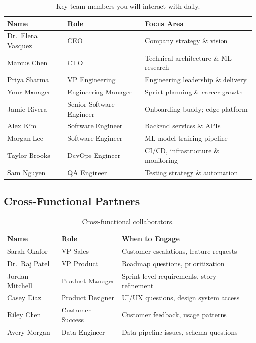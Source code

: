 \documentclass[
    language=english,
    doctype=onboarding-guide,
    institution=none,
]{../../omnilatex}
\begin{document}
\begin{table}[h]
    \centering
    \begin{tabular}{lll}
        \toprule
        \textbf{Name} & \textbf{Role} & \textbf{Focus Area} \\
        \midrule
        Dr.\ Elena Vasquez    & CEO            & Company strategy \& vision \\
        Marcus Chen           & CTO            & Technical architecture \& ML research \\
        Priya Sharma          & VP Engineering & Engineering leadership \& delivery \\
        Your Manager          & Engineering Manager & Sprint planning \& career growth \\
        Jamie Rivera          & Senior Software Engineer & Onboarding buddy; edge platform \\
        Alex Kim              & Software Engineer & Backend services \& APIs \\
        Morgan Lee            & Software Engineer & ML model training pipeline \\
        Taylor Brooks         & DevOps Engineer & CI/CD, infrastructure \& monitoring \\
        Sam Nguyen            & QA Engineer    & Testing strategy \& automation \\
        \bottomrule
    \end{tabular}
    \caption{Key team members you will interact with daily.}
\end{table}

\subsection{Cross-Functional Partners}

\begin{table}[h]
    \centering
    \begin{tabular}{lll}
        \toprule
        \textbf{Name} & \textbf{Role} & \textbf{When to Engage} \\
        \midrule
        Sarah Okafor          & VP Sales        & Customer escalations, feature requests \\
        Dr.\ Raj Patel        & VP Product      & Roadmap questions, prioritization \\
        Jordan Mitchell       & Product Manager & Sprint-level requirements, story refinement \\
        Casey Diaz            & Product Designer & UI/UX questions, design system access \\
        Riley Chen            & Customer Success & Customer feedback, usage patterns \\
        Avery Morgan          & Data Engineer   & Data pipeline issues, schema questions \\
        \bottomrule
    \end{tabular}
    \caption{Cross-functional collaborators.}
\end{table}
\end{document}

